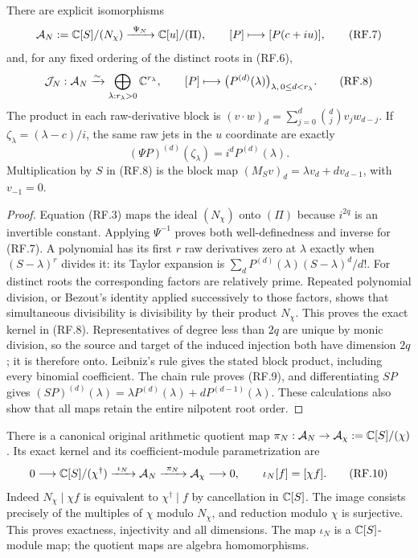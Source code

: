 \begin{theorem}
There are explicit isomorphisms
\[
 \mathcal A_N:=\mathbb C[S]/(N_\chi)
 \xrightarrow{\ \Psi_N\ }\mathbb C[u]/(\Pi),\qquad
 [P]\longmapsto[P(c+iu)],
 \tag{RF.7}
\]
and, for any fixed ordering of the distinct roots in (RF.6),
\[
 \mathcal J_N:\mathcal A_N\xrightarrow{\sim}
 \bigoplus_{\lambda:r_\lambda>0}\mathbb C^{r_\lambda},\qquad
 [P]\longmapsto
       \bigl(P^{(d)}(\lambda)\bigr)_{\lambda,\,0\le d<r_\lambda}.
 \tag{RF.8}
\]
The product in each raw-derivative block is
$(v\cdot w)_d=\sum_{j=0}^d\binom dj v_jw_{d-j}$.
If $\zeta_\lambda=(\lambda-c)/i$, the same raw jets in the $u$
coordinate are exactly
\[
 (\Psi P)^{(d)}(\zeta_\lambda)=i^dP^{(d)}(\lambda).
 \tag{RF.9}
\]
Multiplication by $S$ in (RF.8) is the block map
$(M_Sv)_d=\lambda v_d+d v_{d-1}$, with $v_{-1}=0$.
\end{theorem}

\begin{proof}
Equation (RF.3) maps the ideal $(N_\chi)$ onto $(\Pi)$ because
$i^{2q}$ is an invertible constant. Applying $\Psi^{-1}$ proves
both well-definedness and inverse for (RF.7).
A polynomial has its first $r$ raw derivatives zero at $\lambda$
exactly when $(S-\lambda)^r$ divides it: its Taylor expansion is
$\sum_d P^{(d)}(\lambda)(S-\lambda)^d/d!$. For distinct roots
the corresponding factors are relatively prime. Repeated polynomial
division, or Bezout's identity applied successively to those factors,
shows that simultaneous divisibility is divisibility by their product
$N_\chi$. This proves the exact kernel in (RF.8).
Representatives of degree less than $2q$ are unique by monic division,
so the source and target of the induced injection both have dimension
$2q$; it is therefore onto. Leibniz's rule gives the stated block
product, including every binomial coefficient. The chain rule proves
(RF.9), and differentiating $SP$ gives
$(SP)^{(d)}(\lambda)=\lambda P^{(d)}(\lambda)
+dP^{(d-1)}(\lambda)$. These calculations also show that all maps
retain the entire nilpotent root order.
\end{proof}

There is a canonical original arithmetic quotient map
$\pi_N:\mathcal A_N\to\mathcal A_\chi:=\mathbb C[S]/(\chi)$.
Its exact kernel and its coefficient-module parametrization are
\[
 0\longrightarrow\mathbb C[S]/(\chi^\dagger)
 \xrightarrow{\ \iota_N\ }\mathcal A_N
 \xrightarrow{\ \pi_N\ }\mathcal A_\chi\longrightarrow0,
 \qquad\iota_N[f]=[\chi f].
 \tag{RF.10}
\]
Indeed $N_\chi\mid\chi f$ is equivalent to
$\chi^\dagger\mid f$ by cancellation in $\mathbb C[S]$.
The image consists precisely of the multiples of $\chi$ modulo
$N_\chi$, and reduction modulo $\chi$ is surjective. This proves
exactness, injectivity and all dimensions. The map $\iota_N$ is a
$\mathbb C[S]$-module map; the quotient maps are algebra homomorphisms.

